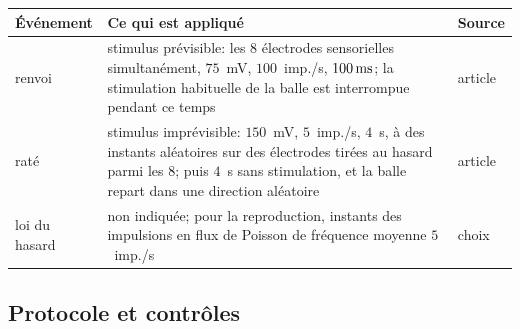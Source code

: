 \begin{center}
\footnotesize
\setlength{\tabcolsep}{4pt}
\renewcommand{\arraystretch}{1.15}
\begin{tabular}{>{\raggedright}p{2.6cm}>{\raggedright}p{8.3cm}>{\raggedright\arraybackslash}p{1.6cm}}
\toprule
Événement & Ce qui est appliqué & Source \\
\midrule
renvoi & stimulus prévisible: les $8$ électrodes sensorielles simultanément, $75$~mV, $100$~imp./s, $100\,\text{ms}$; la stimulation habituelle de la balle est interrompue pendant ce temps & article \\
raté & stimulus imprévisible: $150$~mV, $5$~imp./s, $4$~s, à des instants aléatoires sur des électrodes tirées au hasard parmi les $8$; puis $4$~s sans stimulation, et la balle repart dans une direction aléatoire & article \\
loi du hasard & non indiquée; pour la reproduction, instants des impulsions en flux de Poisson de fréquence moyenne $5$~imp./s & choix \\
\bottomrule
\end{tabular}
\end{center}

\subsection*{Protocole et contrôles}

